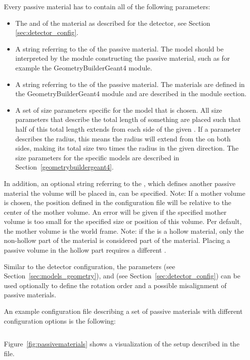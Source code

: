 Every passive material has to contain all of the following parameters:
\begin{itemize}
  \item The  and  of the material as described for the detector, see Section \ref{sec:detector_config}.
  \item A string referring to the  of the passive material.
  The model should be interpreted by the module constructing the passive material, such as for example the GeometryBuilderGeant4 module.
  \item A string referring to the  of the passive material.
  The materials are defined in the GeometryBuilderGeant4 module and are described in the module section.
  \item A set of size parameters specific for the model that is chosen.
  All size parameters that describe the total length of something are placed such that half of this total length extends from each side of the given .
  If a parameter describes the radius, this means the radius will extend from the  on both sides, making its total size two times the radius in the given direction.
  The size parameters for the specific models are described in Section~\ref{geometrybuildergeant4}.
\end{itemize}

In addition, an optional string referring to the , which defines another passive material the volume will be placed in, can be specified.
Note: If a mother volume is chosen, the position defined in the configuration file will be relative to the center of the mother volume. An error will be given if the specified mother volume is too small for the specified size or position of this volume. Per default, the mother volume is the world frame.
Note: if the  is a hollow material, only the non-hollow part of the material is considered part of the material. Placing a passive volume in the hollow part requires a different .

Similar to the detector configuration, the parameters  (see Section~\ref{sec:models_geometry}),  and  (see Section~\ref{sec:detector_config}) can be used optionally to define the rotation order and a possible misalignment of passive materials.

An example configuration file describing a set of passive materials with different configuration options is the following:
\inputminted[frame=single,framesep=3pt,breaklines=true,tabsize=2,linenos]{ini}{../../etc/manual_passive_materials.conf}
Figure~\ref{fig:passivematerials} shows a visualization of the setup described in the file.

